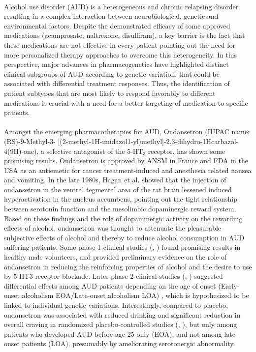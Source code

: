 \paragraph{}

Alcohol use disorder (AUD) is a heterogeneous and chronic relapsing disorder resulting in a complex interaction between neurobiological, genetic and environmental factors. Despite the demonstrated efficacy of some approved medications (acamprosate, naltrexone, disulfiram), a key barrier is the fact that these medications are not effective in every patient pointing out the need for more personalized therapy approaches to overcome this heterogeneity. In this perspective, major advances in pharmacogenetics have highlighted distinct clinical subgroups of AUD according to genetic variation, that could be associated with differential treatment responses. Thus, the identification of patient subtypes that are most likely to respond favorably to different medications is crucial with a need for a better targeting of medication to specific patients.

\paragraph{}

Amongst the emerging pharmacotherapies for AUD, Ondansetron (IUPAC name: (RS)-9-Methyl-3- [(2-methyl-1H-imidazol1-yl)methyl]-2,3-dihydro-1Hcarbazol-4(9H)-one), a selective antagonist of the $\text{5-HT}_3$ receptor, has shown some promising results. Ondansetron is approved by ANSM in France and FDA in the USA as an antiemetic for cancer treatment-induced and anesthesia related nausea and vomiting. 
In the late 1980s, Hagan et al. \cite{hagan_effect_1987} showed that the injection of ondansetron in the ventral tegmental area of the rat brain lessened induced hyperactivation in the nucleus accumbens, pointing out the tight relationship between serotonin function and the mesolimbic dopaminergic reward system. Based on these findings and the role of dopaminergic activity on the rewarding effects of alcohol, ondansetron was thought to attenuate the pleasurable subjective effects of alcohol and thereby to reduce alcohol consumption in AUD suffering patients. Some phase 1 clinical studies (\cite{grant_blockade_1991}, \cite{johnson_attenuation_1993}) found promising results in healthy male volunteers, and provided preliminary evidence on the role of ondansetron in reducing the reinforcing properties of alcohol and the desire to use by 5-HT3 receptor blockade. 
Later phase 2 clinical studies (\cite{johnson_ondansetron_2000}, \cite{kranzler_effects_2003}) suggested differential effects among AUD patients depending on the age of onset (Early-onset alcoholism EOA/Late-onset alcoholism LOA) \cite{varma1994correlates}, which is hypothesized to be linked to individual genetic variations. Interestingly, compared to placebo, ondansetron was associated with reduced drinking and significant reduction in overall craving in randomized placebo-controlled studies (\cite{johnson_ondansetron_2000}, \cite{johnson_ondansetron_2002}), but only among patients who developed AUD before age 25 only (EOA), and not among late-onset patients (LOA), presumably by ameliorating serotonergic abnormality.

